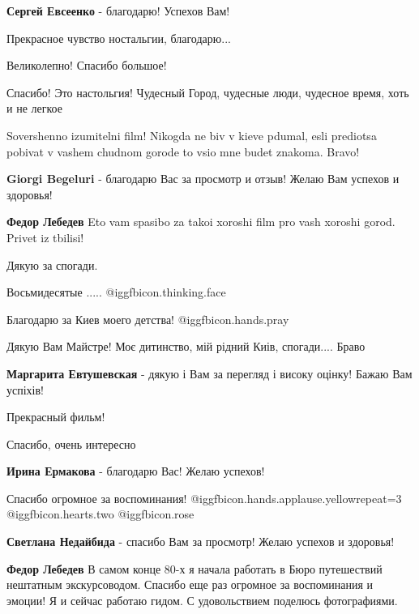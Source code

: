 \begin{itemize}
\textbf{Сергей Евсеенко} - благодарю! Успехов Вам!

Прекрасное чувство ностальгии, благодарю...

Великолепно! Спасибо большое!

Спасибо! Это настольгия! Чудесный Город, чудесные люди, чудесное время, хоть и не легкое


Sovershenno izumitelni film! Nikogda ne biv v kieve pdumal, esli prediotsa
pobivat v vashem chudnom gorode to vsio mne budet znakoma. Bravo!

\begin{itemize} %
\textbf{Giorgi Begeluri} - благодарю Вас за просмотр и отзыв! Желаю Вам успехов и здоровья!

\textbf{Федор Лебедев}
Eto vam spasibo za takoi xoroshi film pro vash xoroshi gorod. Privet iz tbilisi!
\end{itemize} %

Дякую за спогади.

Восьмидесятые .....  @igg{fbicon.thinking.face} 

Благодарю за Киев моего детства! @igg{fbicon.hands.pray} 

Дякую Вам Майстре! Моє дитинство, мій рідний Киів, спогади.... Браво

\textbf{Маргарита Евтушевская} - дякую і Вам за перегляд і високу оцінку! Бажаю Вам успіхів!

Прекрасный фильм!

Спасибо, очень интересно

\textbf{Ирина Ермакова} - благодарю Вас! Желаю успехов!

Спасибо огромное за воспоминания! @igg{fbicon.hands.applause.yellow}{repeat=3}
@igg{fbicon.hearts.two}  @igg{fbicon.rose} 

\begin{itemize} %
\textbf{Светлана Недайбида} - спасибо Вам за просмотр! Желаю успехов и здоровья!

\textbf{Федор Лебедев} В самом конце 80-х я начала работать в Бюро путешествий нештатным экскурсоводом. Спасибо еще раз огромное за воспоминания и эмоции!
Я и сейчас работаю гидом. С удовольствием поделюсь фотографиями.
\end{itemize} %


\end{itemize}
